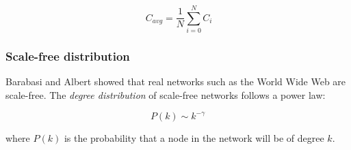 \documentclass[a4paper,11pt,titlepage]{article}
\begin{document}
\[ \ C_{avg} = \frac{1}{N}\sum_{i=0}^{N} C_i \]

\subsubsection{Scale-free distribution}
\label{sec:scale-free}

Barabasi and Albert showed that real networks such as the World Wide Web are
scale-free. The \emph{degree distribution} of scale-free networks follows a
power law:

\[ P(k) \sim k^{-\gamma} \]

where $P(k)$ is the probability that a node in the network will be of degree $k$.








\end{document}
